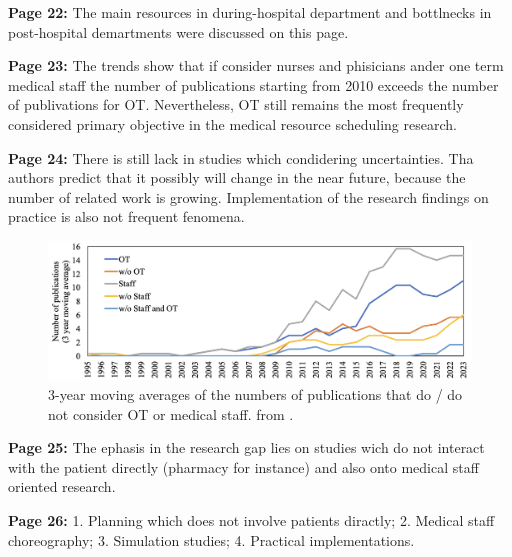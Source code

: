     \textbf{Page 22:}
    The main resources in during-hospital department and bottlnecks in post-hospital demartments were discussed on this page.
    
    \textbf{Page 23:}
    The trends show that if consider nurses and phisicians ander one term medical staff the number of publications starting from 2010 exceeds the number of publivations for OT. Nevertheless, OT still remains the most frequently considered primary objective in the medical resource scheduling research.
    
    \textbf{Page 24:}
    There is still lack in studies which condidering uncertainties. Tha authors predict that it possibly will change in the near future, because the number of related work is growing. Implementation of the research findings on practice is also not frequent fenomena.
    \begin{figure}[H]
        \centering
        \includegraphics[width=1\textwidth]{figures/0010_SR02NL23/fig10.png}
        \caption{3-year moving averages of the numbers of publications that do / do not consider OT or medical staff. from \cite{x338}.}
        \label{fig10:0010_SR02NL23}
    \end{figure}

    \textbf{Page 25:}
    The ephasis in the research gap lies on studies wich do not interact with the patient directly (pharmacy for instance) and also onto medical staff oriented research.

    \textbf{Page 26:}
        1. Planning which does not involve patients diractly; 2. Medical staff choreography; 3. Simulation studies; 4. Practical implementations.
